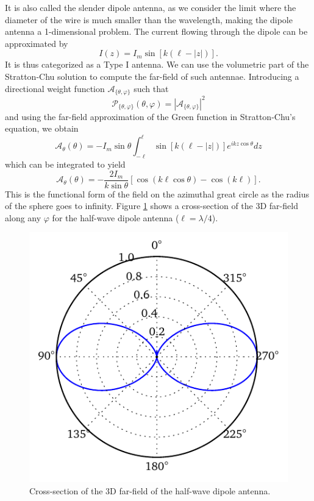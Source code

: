 \begin{exmp}
		\noindent It is also called the
		slender dipole antenna, as we consider the limit where the diameter of
		the wire is much smaller than the wavelength, making the dipole antenna
		a 1-dimensional problem. The current flowing through the dipole can be
		approximated by 
			\begin{equation}
				I(z) = I_m\sin\left[k(\ell-|z|)\right].
			\end{equation}
		It is thus categorized as a Type I antenna. We can use the volumetric part
		of the Stratton-Chu solution to compute the far-field of such antennae. Introducing
		a directional weight function $\mathcal{A}_{\{\theta,\varphi\}}$ such that
			\begin{equation}
				\mathcal{P}_{\{\theta,\varphi\}}(\theta,\varphi) = |\mathcal{A}_{\{\theta,\varphi\}}|^2
			\end{equation}
		and using the far-field approximation of the Green function in Stratton-Chu's equation, we obtain
			\begin{equation}
				\mathcal{A}_\theta(\theta) = -I_m\sin\theta\int_{-\ell}^\ell\sin\left[k(\ell-|z|)\right]e^{ikz\cos\theta}dz
			\end{equation}
		which can be integrated to yield
			\begin{equation}
				\mathcal{A}_\theta(\theta) = -\frac{2I_m}{k\sin\theta}\left[\cos(k\ell\cos\theta)-\cos(k\ell)\right].
			\end{equation}
		This is the functional form of the field on the azimuthal great circle as the radius of the sphere goes
		to infinity.  Figure \ref{fig:active.antennae.dipoleFarField} shows a cross-section of the 3D far-field
		along any $\varphi$ for the half-wave dipole antenna ($\ell=\lambda/4$).
		
		\begin{figure}
			\centering
			\includegraphics{figs/active/farField-dipole.pdf}
			\caption{Cross-section of the 3D far-field of the half-wave dipole antenna.}
			\label{fig:active.antennae.dipoleFarField}
		\end{figure}
	\end{exmp}
	

